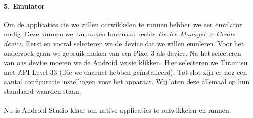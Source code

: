 \paragraph{5. Emulator}
Om de applicaties die we zullen ontwikkelen te runnen hebben we een emulator nodig. 
Deze kunnen we aanmaken bovenaan rechts \textit{Device Manager > Create device}. 
Eerst en vooral selecteren we de device dat we willen emuleren. Voor het onderzoek 
gaan we gebruik maken van een Pixel 3 als device. Na het selecteren van ons device moeten we 
de Android versie klikken. Hier selecteren we Tiramisu met API Level 33 (Die we daarnet hebben geïnstalleerd). 
Tot slot zijn er nog een aantal configuratie instellingen voor het apparaat. Wij laten deze allemaal op hun standaard 
waarden staan.
\\\\
Nu is Android Studio klaar om native applicaties te ontwikkelen en runnen. 
